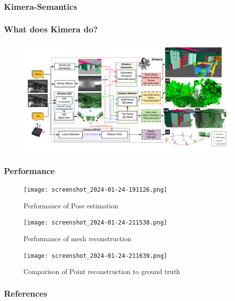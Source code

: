 \documentclass[11pt]{beamer}
\begin{document}
\begin{frame}
\frametitle{Kimera-Semantics}
    \begin{figure}[ht]
        \centering
    \end{figure}
\end{frame}
\begin{frame}
\frametitle{What does Kimera do?}
\begin{figure}
    \includegraphics[width=\linewidth]{kimera_chart_23.jpeg} 
\end{figure}
\end{frame}
\begin{frame}
\frametitle{Performance}
\begin{minipage}{0.49\textwidth}
\begin{figure}
    \texttt{[image: screenshot\_2024-01-24-191126.png]} 
    \caption{Performance of Pose estimation}
\end{figure}
\end{minipage}
\begin{minipage}{0.49\textwidth}
\begin{figure}
    \texttt{[image: screenshot\_2024-01-24-211538.png]} 
    \caption{Performance of mesh reconstruction}
\end{figure}
\begin{figure}
    \texttt{[image: screenshot\_2024-01-24-211639.png]} 
    \caption{Comparison of Point reconstruction to ground truth}
\end{figure}
\end{minipage}
\end{frame}
\begin{frame}[allowframebreaks]
\footnotesize
  \frametitle{References}
  
{}
\end{frame}
\end{document}
